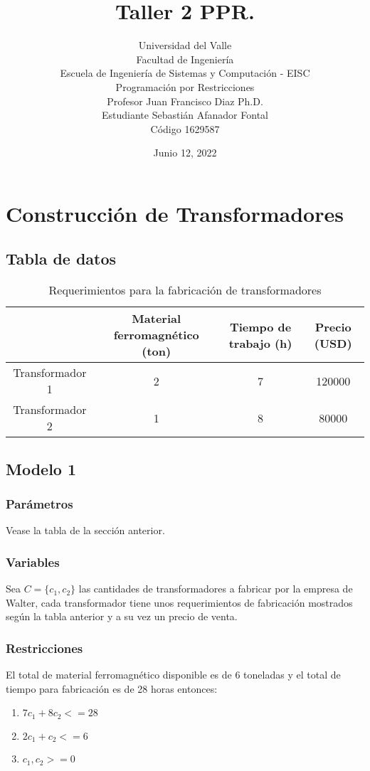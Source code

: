 \documentclass{article}
\title{
    Taller 2 PPR.\\
}
\author{
    Universidad del Valle\\
    Facultad de Ingeniería\\
    Escuela de Ingeniería de Sistemas y Computación - EISC\\
    Programación por Restricciones\\
    Profesor Juan Francisco Diaz Ph.D.\\
    Estudiante Sebastián Afanador Fontal\\
    Código 1629587
}
\date{Junio 12, 2022}
\begin{document}
\maketitle
\section{Construcción de Transformadores}
\subsection{Tabla de datos}
\begin{table}
    \begin{center}
        \begin{tabular}{ |c|c|c|c| } 
            \hline
            & Material ferromagnético (ton) & 
            Tiempo de trabajo (h) & 
            Precio (USD) \\ 
            \hline\hline
            Transformador 1 & 2 & 7 & 120000 \\ 
            Transformador 2 & 1 & 8 & 80000 \\ 
            \hline
        \end{tabular}
        \caption{Requerimientos para la fabricación de transformadores}
        \label{tab:caption}
    \end{center}
\end{table}

\subsection{Modelo 1}
\subsubsection{Parámetros}
Vease la tabla de la sección anterior.
\subsubsection{Variables}
Sea $C=\{c_1,c_2\}$ las cantidades de transformadores a fabricar por la empresa de Walter, cada transformador tiene unos requerimientos de fabricación mostrados según la tabla anterior y a su vez un precio de venta.
\subsubsection{Restricciones}
El total de material ferromagnético disponible es de 6 toneladas y el total de tiempo para fabricación es de 28 horas entonces:\\
\begin{enumerate}
    \item $7c_1 + 8c_2 <= 28$
    \item $2c_1 + c_2 <= 6$
    \item $c_1, c_2 >= 0$
\end{enumerate}
\end{document}
